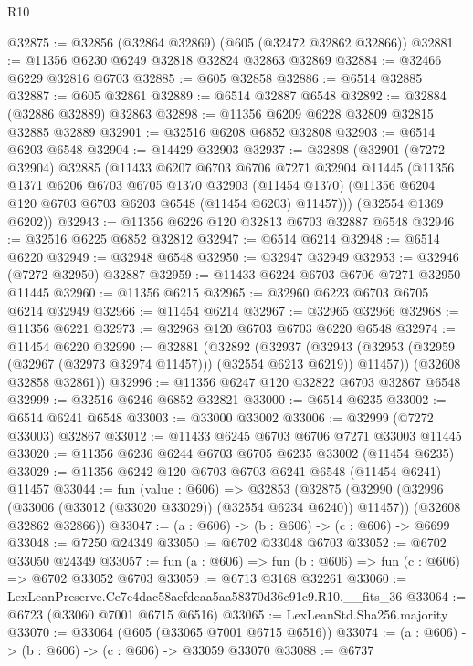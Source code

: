 \begin{lexlean}{R10}
\begin{coremodule}
@32875 := @32856 (@32864 @32869) (@605 (@32472 @32862 @32866))
@32881 := @11356 @6230 @6249 @32818 @32824 @32863 @32869
@32884 := @32466 @6229 @32816 @6703
@32885 := @605 @32858
@32886 := @6514 @32885
@32887 := @605 @32861
@32889 := @6514 @32887 @6548
@32892 := @32884 (@32886 @32889) @32863
@32898 := @11356 @6209 @6228 @32809 @32815 @32885 @32889
@32901 := @32516 @6208 @6852 @32808
@32903 := @6514 @6203 @6548
@32904 := @14429 @32903
@32937 := @32898
    (@32901
      (@7272 @32904)
      @32885
      (@11433
        @6207
        @6703
        @6706
        @7271
        @32904
        @11445
        (@11356
          @1371
          @6206
          @6703
          @6705
          @1370
          @32903
          (@11454 @1370)
          (@11356 @6204 @120 @6703 @6703 @6203 @6548 (@11454 @6203) @11457)))
      (@32554 @1369 @6202))
@32943 := @11356 @6226 @120 @32813 @6703 @32887 @6548
@32946 := @32516 @6225 @6852 @32812
@32947 := @6514 @6214
@32948 := @6514 @6220
@32949 := @32948 @6548
@32950 := @32947 @32949
@32953 := @32946 (@7272 @32950) @32887
@32959 := @11433 @6224 @6703 @6706 @7271 @32950 @11445
@32960 := @11356 @6215
@32965 := @32960 @6223 @6703 @6705 @6214 @32949
@32966 := @11454 @6214
@32967 := @32965 @32966
@32968 := @11356 @6221
@32973 := @32968 @120 @6703 @6703 @6220 @6548
@32974 := @11454 @6220
@32990 := @32881
    (@32892
      (@32937
        (@32943 (@32953 (@32959 (@32967 (@32973 @32974 @11457))) (@32554 @6213 @6219)) @11457))
      (@32608 @32858 @32861))
@32996 := @11356 @6247 @120 @32822 @6703 @32867 @6548
@32999 := @32516 @6246 @6852 @32821
@33000 := @6514 @6235
@33002 := @6514 @6241 @6548
@33003 := @33000 @33002
@33006 := @32999 (@7272 @33003) @32867
@33012 := @11433 @6245 @6703 @6706 @7271 @33003 @11445
@33020 := @11356 @6236 @6244 @6703 @6705 @6235 @33002 (@11454 @6235)
@33029 := @11356 @6242 @120 @6703 @6703 @6241 @6548 (@11454 @6241) @11457
@33044 := fun (value : @606) =>
  @32853
    (@32875
      (@32990 (@32996 (@33006 (@33012 (@33020 @33029)) (@32554 @6234 @6240)) @11457))
      (@32608 @32862 @32866))
@33047 := (a : @606) -> (b : @606) -> (c : @606) -> @6699
@33048 := @7250 @24349
@33050 := @6702 @33048 @6703
@33052 := @6702 @33050 @24349
@33057 := fun (a : @606) => fun (b : @606) => fun (c : @606) => @6702 @33052 @6703
@33059 := @6713 @3168 @32261
@33060 := LexLeanPreserve.Ce7e4dac58aefdeaa5aa58370d36e91c9.R10.__fits_36
@33064 := @6723 (@33060 @7001 @6715 @6516)
@33065 := LexLeanStd.Sha256.majority
@33070 := @33064 (@605 (@33065 @7001 @6715 @6516))
@33074 := (a : @606) -> (b : @606) -> (c : @606) -> @33059 @33070
@33088 := @6737

\end{coremodule}
\end{lexlean}
